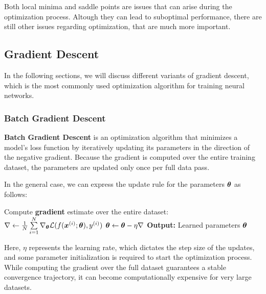

Both local minima and saddle points are issues that can arise during the optimization process. Altough they can lead to suboptimal performance,
there are still other issues regarding optimization, that are much more important.

\subsection{Gradient Descent}
In the following sections, we will discuss different variants of gradient descent, which is the most commonly used optimization algorithm for training neural networks.

\subsubsection{Batch Gradient Descent}
\textbf{Batch Gradient Descent} is an optimization algorithm that minimizes a model's loss function by iteratively updating its parameters in the direction of the negative gradient.
Because the gradient is computed over the entire training dataset, the parameters are updated only once per full data pass.

In the general case, we can express the update rule for the parameters $\boldsymbol{\theta}$ as follows:
\begin{algorithm}[H]
    \caption{Batch Gradient Descent}
    \begin{algorithmic}[1]
            \State Compute \textbf{gradient} estimate over the entire dataset:
            \State $\nabla \leftarrow \frac{1}{N} \sum\limits_{i=1}^{N} \nabla_{\boldsymbol{\theta}} \mathcal{L}(f(\boldsymbol{x}^{(i)}; \boldsymbol{\theta}), y^{(i)})$
            \State $\boldsymbol{\theta} \leftarrow \boldsymbol{\theta} - \eta \nabla$
        \EndWhile
        \State \textbf{Output:} Learned parameters $\boldsymbol{\theta}$
    \end{algorithmic}
\end{algorithm}
Here, $\eta$ represents the learning rate, which dictates the step size of the updates, and some parameter initialization is required to start the optimization process. While computing the gradient over the full dataset guarantees a stable convergence trajectory, it can become computationally expensive for very large datasets.

